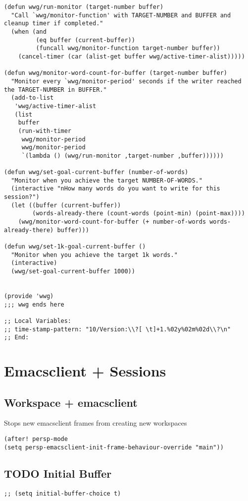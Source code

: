 \documentclass[8pt]{article}
\begin{document}
\begin{verbatim}
(defun wwg/run-monitor (target-number buffer)
  "Call `wwg/monitor-function' with TARGET-NUMBER and BUFFER and cleanup timer if completed."
  (when (and
         (eq buffer (current-buffer))
         (funcall wwg/monitor-function target-number buffer))
    (cancel-timer (car (alist-get buffer wwg/active-timer-alist)))))

(defun wwg/monitor-word-count-for-buffer (target-number buffer)
  "Monitor every `wwg/monitor-period' seconds if the writer reached the TARGET-NUMBER in BUFFER."
  (add-to-list
   'wwg/active-timer-alist
   (list
    buffer
    (run-with-timer
     wwg/monitor-period
     wwg/monitor-period
     `(lambda () (wwg/run-monitor ,target-number ,buffer))))))

(defun wwg/set-goal-current-buffer (number-of-words)
  "Monitor when you achieve the target NUMBER-OF-WORDS."
  (interactive "nHow many words do you want to write for this session?")
  (let ((buffer (current-buffer))
        (words-already-there (count-words (point-min) (point-max))))
    (wwg/monitor-word-count-for-buffer (+ number-of-words words-already-there) buffer)))

(defun wwg/set-1k-goal-current-buffer ()
  "Monitor when you achieve the target 1k words."
  (interactive)
  (wwg/set-goal-current-buffer 1000))


(provide 'wwg)
;;; wwg ends here

;; Local Variables:
;; time-stamp-pattern: "10/Version:\\?[ \t]+1.%02y%02m%02d\\?\n"
;; End:
\end{verbatim}

\section{Emacsclient + Sessions}
\label{sec:orgdd212b4}
\subsection{Workspace + emacsclient}
\label{sec:org421dc1a}
Stops new emacsclient frames from creating new workspaces
\begin{verbatim}
(after! persp-mode
(setq persp-emacsclient-init-frame-behaviour-override "main"))
\end{verbatim}
\subsection{{\bfseries\sffamily TODO} Initial Buffer}
\label{sec:org84a3329}
\begin{verbatim}
;; (setq initial-buffer-choice t)
\end{verbatim}
\end{document}
